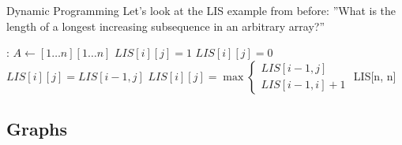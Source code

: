 \documentclass{beamer}
\begin{document}
\begin{frame}[t]{Dynamic Programming}
  Let's look at the LIS example from before:
  ''What is the length of a longest increasing subsequence in an arbitrary array?''
  \pause
  \begin{algorithmic}
    :
        \State $A \gets [1\dotsc n][1\dotsc n]$ 
                    \State $LIS[i][j] = 1$
                \Else 
                    \State $LIS[i][j] = 0$
                \EndIf
            \EndFor
        \EndFor
                    \State $LIS[i][j] = LIS[i - 1, j]$
                \Else
                    \State $LIS[i][j] = \max{ 
                        \begin{cases}
                            LIS[i-1,j]\\
                            LIS[i - 1, i] + 1
                        \end{cases}}$
                \EndIf
            \EndFor
        \EndFor
        \State \Return LIS[n, n]
    \EndProcedure
  
  \end{algorithmic} 
\end{frame}

\subsection{Graphs}
\end{document}
